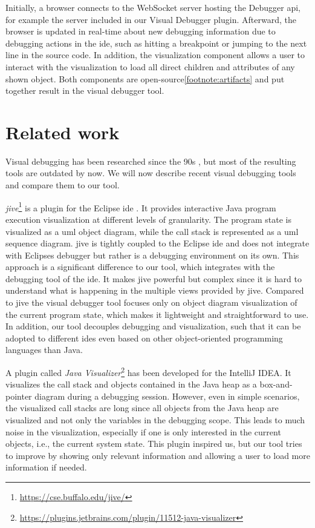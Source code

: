 \documentclass[conference]{IEEEtran}
\newcommand{\intellij}{IntelliJ IDEA}
\begin{document}
Initially, a browser connects to the WebSocket server hosting the Debugger \gls*{api}, for example the server included in our Visual Debugger plugin.
Afterward, the browser is updated in real-time about new debugging information due to debugging actions in the \gls*{ide}, such as hitting a breakpoint or jumping to the next line in the source code.
In addition, the visualization component allows a user to interact with the visualization to load all direct children and attributes of any shown object.
Both components are open-source\cref{footnote:artifacts} and put together result in the visual debugger tool.

\section{Related work} \label{sec:relatedWork}
Visual debugging has been researched since the 90s \cite{baeza-yatesVisualDebuggingAutomatic1996, jerdingUsingVisualizationFoster1994, mukherjeaVisualDebuggingIntegrating1994, hansonSimpleExtensibleGraphical1997}, but most of the resulting tools are outdated by now.
We will now describe recent visual debugging tools and compare them to our tool.

\textit{\gls*{jive}}\footnote{\url{https://cse.buffalo.edu/jive/}} is a plugin for the Eclipse \gls*{ide} \cite{czyzDeclarativeVisualDebugging2007,k.p.FiniteStateModel2021}.
It provides interactive Java program execution visualization at different levels of granularity.
The program state is visualized as a \gls*{uml} object diagram, while the call stack is represented as a \gls*{uml} sequence diagram.
\gls*{jive} is tightly coupled to the Eclipse \gls*{ide} and does not integrate with Eclipses debugger but rather is a debugging environment on its own.
This approach is a significant difference to our tool, which integrates with the debugging tool of the \gls*{ide}.
It makes \gls*{jive} powerful but complex since it is hard to understand what is happening in the multiple views provided by \gls*{jive}.
Compared to \gls*{jive} the visual debugger tool focuses only on object diagram visualization of the current program state, which makes it lightweight and straightforward to use.
In addition, our tool decouples debugging and visualization, such that it can be adopted to different \glspl*{ide} even based on other object-oriented programming languages than Java.

A plugin called \textit{Java Visualizer}\footnote{\url{https://plugins.jetbrains.com/plugin/11512-java-visualizer}} has been developed for the \intellij{}.
It visualizes the call stack and objects contained in the Java heap as a box-and-pointer diagram during a debugging session.
However, even in simple scenarios, the visualized call stacks are long since all objects from the Java heap are visualized and not only the variables in the debugging scope.
This leads to much noise in the visualization, especially if one is only interested in the current objects, i.e., the current system state.
This plugin inspired us, but our tool tries to improve by showing only relevant information and allowing a user to load more information if needed.
\end{document}
